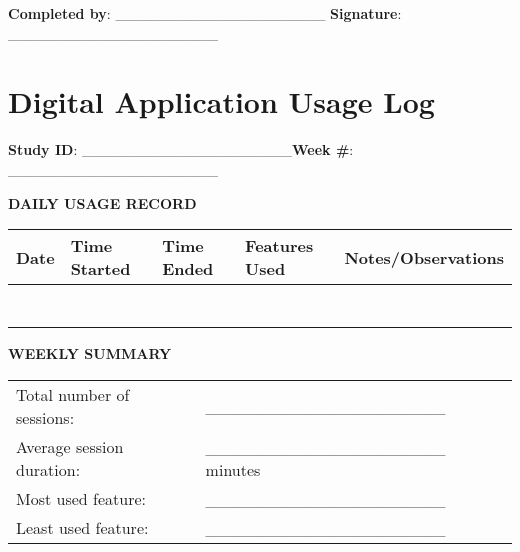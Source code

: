 \begin{tcolorbox}[title=Participant Demographics Form]
\vspace{0.5cm}

\textbf{Completed by}: \_\_\_\_\_\_\_\_\_\_\_\_\_\_\_\_\_\_\_\_ \hfill \textbf{Signature}: \_\_\_\_\_\_\_\_\_\_\_\_\_\_\_\_\_\_\_\_
\end{tcolorbox}

\section{Digital Application Usage Log}

\begin{tcolorbox}[title=Digital Application Usage Log]
\textbf{Study ID}: \_\_\_\_\_\_\_\_\_\_\_\_\_\_\_\_\_\_\_\_\hfill \textbf{Week \#}: \_\_\_\_\_\_\_\_\_\_\_\_\_\_\_\_\_\_\_\_

\vspace{0.5cm}

\textbf{DAILY USAGE RECORD}

\begin{tabular}{|p{2cm}|p{2cm}|p{2.5cm}|p{2.5cm}|p{4.5cm}|}
\hline
\textbf{Date} & \textbf{Time Started} & \textbf{Time Ended} & \textbf{Features Used} & \textbf{Notes/Observations} \\
\hline
 &  &  &  &  \\
\hline
 &  &  &  &  \\
\hline
 &  &  &  &  \\
\hline
 &  &  &  &  \\
\hline
 &  &  &  &  \\
\hline
 &  &  &  &  \\
\hline
 &  &  &  &  \\
\hline
\end{tabular}

\vspace{0.5cm}

\textbf{WEEKLY SUMMARY}

\begin{tabular}{p{7cm}p{7cm}}
Total number of sessions: & \_\_\_\_\_\_\_\_\_\_\_\_\_\_\_\_\_\_\_\_ \\[0.3cm]
Average session duration: & \_\_\_\_\_\_\_\_\_\_\_\_\_\_\_\_\_\_\_\_ minutes \\[0.3cm]
Most used feature: & \_\_\_\_\_\_\_\_\_\_\_\_\_\_\_\_\_\_\_\_ \\[0.3cm]
Least used feature: & \_\_\_\_\_\_\_\_\_\_\_\_\_\_\_\_\_\_\_\_ \\[0.3cm]
\end{tabular}

\vspace{0.5cm}


\end{tcolorbox}
